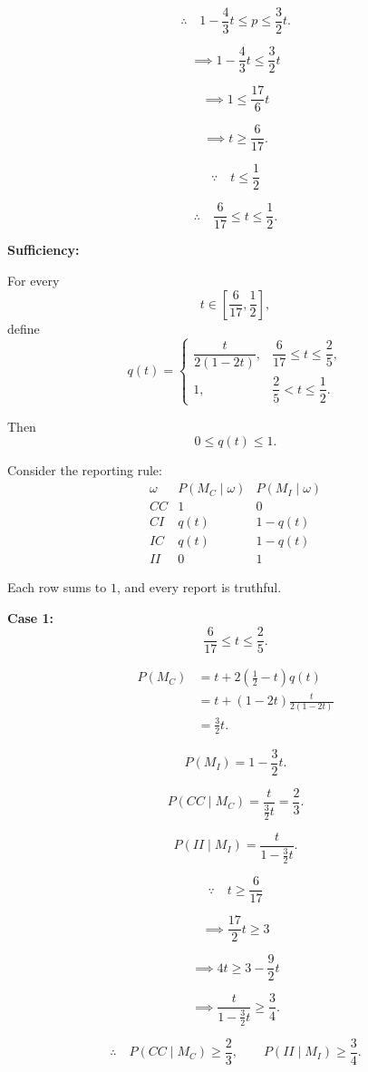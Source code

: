 \documentclass[11pt,a4paper]{article}
\begin{document}
\[
\therefore\quad
1-\frac43t\leq p\leq\frac32t.
\]

\[
\implies
1-\frac43t\leq\frac32t
\]

\[
\implies
1\leq\frac{17}{6}t
\]

\[
\implies
t\geq\frac6{17}.
\]

\[
\because\quad t\leq\frac12
\]

\[
\therefore\quad
\frac6{17}\leq t\leq\frac12.
\]


\textbf{Sufficiency:}

For every
\[
t\in\left[\frac6{17},\frac12\right],
\]
define
\[
q(t)=
\begin{cases}
\dfrac{t}{2(1-2t)},
&\dfrac6{17}\leq t\leq\dfrac25,\\[8pt]
1,
&\dfrac25<t\leq\dfrac12.
\end{cases}
\]

Then
\[
0\leq q(t)\leq1.
\]

Consider the reporting rule:
\[
\renewcommand{\arraystretch}{1.5}
\begin{array}{c|cc}
\omega
&P(M_C\mid\omega)
&P(M_I\mid\omega)\\
\hline
CC&1&0\\
CI&q(t)&1-q(t)\\
IC&q(t)&1-q(t)\\
II&0&1
\end{array}
\]

Each row sums to $1$, and every report is truthful.

\textbf{Case 1:}
\[
\frac6{17}\leq t\leq\frac25.
\]

\[
\begin{aligned}
P(M_C)
&=t+2\left(\frac12-t\right)q(t)\\
&=t+(1-2t)\frac{t}{2(1-2t)}\\
&=\frac32t.
\end{aligned}
\]

\[
P(M_I)=1-\frac32t.
\]

\[
P(CC\mid M_C)
=\frac{t}{\frac32t}
=\frac23.
\]

\[
P(II\mid M_I)
=\frac{t}{1-\frac32t}.
\]

\[
\because\quad
t\geq\frac6{17}
\]

\[
\implies
\frac{17}{2}t\geq3
\]

\[
\implies
4t\geq3-\frac92t
\]

\[
\implies
\frac{t}{1-\frac32t}\geq\frac34.
\]

\[
\therefore\quad
P(CC\mid M_C)\geq\frac23,
\qquad
P(II\mid M_I)\geq\frac34.
\]
\end{document}
